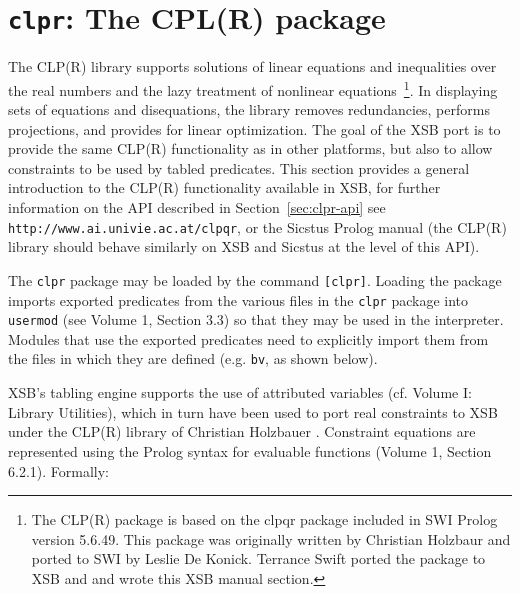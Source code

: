 \section{{\tt clpr}: The CPL(R) package} \label{sec:clpr}
%
The CLP(R) library supports solutions of linear equations and
inequalities over the real numbers and the lazy treatment of nonlinear
equations~\footnote{The CLP(R) package is based on the clpqr package
  included in SWI Prolog version 5.6.49.  This package was originally
  written by Christian Holzbaur and ported to SWI by Leslie De Konick.
  Terrance Swift ported the package to XSB and and wrote this XSB
  manual section.}.  In displaying sets of equations and disequations,
the library removes redundancies, performs projections, and provides
for linear optimization.  The goal of the XSB port is to provide the
same CLP(R) functionality as in other platforms, but also to allow
constraints to be used by tabled predicates.  This section provides a
general introduction to the CLP(R) functionality available in XSB, for
further information on the API described in Section~\ref{sec:clpr-api}
see {\tt http://www.ai.univie.ac.at/clpqr}, or the Sicstus Prolog
manual (the CLP(R) library should behave similarly on XSB and Sicstus
at the level of this API).

The {\tt clpr} package may be loaded by the command {\tt [clpr]}.
Loading the package imports exported predicates from the various files
in the {\tt clpr} package into {\tt usermod} (see Volume 1, Section
3.3) so that they may be used in the interpreter.  Modules that use
the exported predicates need to explicitly import them from the files
in which they are defined (e.g. {\tt bv}, as shown below).

XSB's tabling engine supports the use of attributed variables
(cf. Volume I: Library Utilities), which in turn have been used to
port real constraints to XSB under the CLP(R) library of Christian
Holzbauer \cite{Holz95}.  Constraint equations are represented using
the Prolog syntax for evaluable functions (Volume 1, Section 6.2.1).
Formally:

